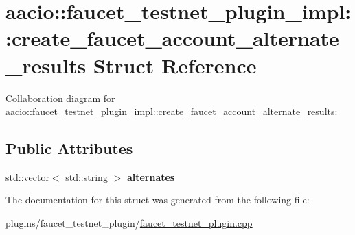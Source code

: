 \hypertarget{structaacio_1_1faucet__testnet__plugin__impl_1_1create__faucet__account__alternate__results}{}\section{aacio\+:\+:faucet\+\_\+testnet\+\_\+plugin\+\_\+impl\+:\+:create\+\_\+faucet\+\_\+account\+\_\+alternate\+\_\+results Struct Reference}
\label{structaacio_1_1faucet__testnet__plugin__impl_1_1create__faucet__account__alternate__results}


Collaboration diagram for aacio\+:\+:faucet\+\_\+testnet\+\_\+plugin\+\_\+impl\+:\+:create\+\_\+faucet\+\_\+account\+\_\+alternate\+\_\+results\+:
\subsection*{Public Attributes}
\begin{DoxyCompactItemize}
\item 
\mbox{\label{structaacio_1_1faucet__testnet__plugin__impl_1_1create__faucet__account__alternate__results_a06943bf332b1808db7642fc9f6dc58a5}} 
\mbox{\hyperlink{classstd_1_1vector}{std\+::vector}}$<$ std\+::string $>$ {\bfseries alternates}
\end{DoxyCompactItemize}


The documentation for this struct was generated from the following file\+:\begin{DoxyCompactItemize}
\item 
plugins/faucet\+\_\+testnet\+\_\+plugin/\mbox{\hyperlink{faucet__testnet__plugin_8cpp}{faucet\+\_\+testnet\+\_\+plugin.\+cpp}}\end{DoxyCompactItemize}
